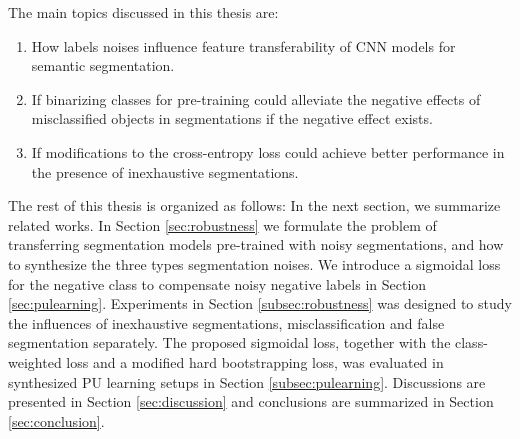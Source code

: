 
The main topics discussed in this thesis are:
\begin{enumerate}
  \item How labels noises influence feature transferability of CNN models for semantic segmentation.
  \item If binarizing classes for pre-training could alleviate the negative effects of misclassified objects in segmentations if the negative effect exists.
  \item If modifications to the cross-entropy loss could achieve better performance in the presence of inexhaustive segmentations.
\end{enumerate}


The rest of this thesis is organized as follows:
In the next section, we summarize related works.
In Section \ref{sec:robustness} we formulate the problem of transferring segmentation models pre-trained with noisy segmentations, and how to synthesize the three types segmentation noises.
We introduce a sigmoidal loss for the negative class to compensate noisy negative labels in Section \ref{sec:pulearning}.
Experiments in Section \ref{subsec:robustness} was designed to study the influences of inexhaustive segmentations, misclassification and false segmentation separately.
The proposed sigmoidal loss, together with the class-weighted loss and a modified hard bootstrapping loss, was evaluated in synthesized PU learning setups in Section \ref{subsec:pulearning}.
Discussions are presented in Section \ref{sec:discussion} and conclusions are summarized in Section \ref{sec:conclusion}.
